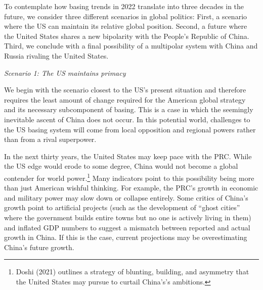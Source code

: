 To contemplate how basing trends in 2022 translate into three decades in the future, we consider three different scenarios in global politics: First, a scenario where the US can maintain its relative global position. Second, a future where the United States shares a new bipolarity with the People's Republic of China. Third, we conclude with a final possibility of a multipolar system with China and Russia rivaling the United States. 

\textit{Scenario 1: The US maintains primacy}

We begin with the scenario closest to the US's present situation and therefore requires the least amount of change required for the American global strategy and its necessary subcomponent of basing. This is a case in which the seemingly inevitable ascent of China does not occur. In this potential world, challenges to the US basing system will come from local opposition and regional powers rather than from a rival superpower.

In the next thirty years, the United States may keep pace with the PRC. While the US edge would erode to some degree, China would not become a global contender for world power.\footnote{Doshi (2021) outlines a strategy of blunting, building, and asymmetry that the United States may pursue to curtail China's's ambitions.} Many indicators point to this possibility being more than just American wishful thinking. For example, the PRC's growth in economic and military power may slow down or collapse entirely. Some critics of China's growth point to artificial projects (such as the development of ``ghost cities'' where the government builds entire towns but no one is actively living in them) and inflated GDP numbers to suggest a mismatch between reported and actual growth in China.\cite{Yu2014,Roy2020} If this is the case, current projections may be overestimating China's future growth.

